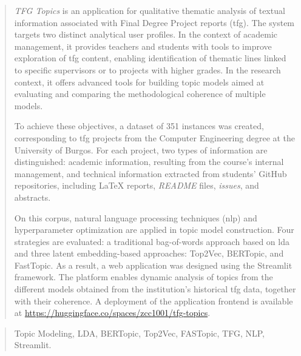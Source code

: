 \documentclass[a4paper,12pt,twoside]{memoir}
\newcommand{\nombreProyecto}{\textit{TFG Topics}\xspace}
\begin{document}
\clearpage

\renewcommand*\abstractname{Abstract}
\begin{abstract}
  \nombreProyecto{} is an application for qualitative thematic analysis of textual information associated with Final Degree Project reports (\Acrshort{tfg}). The system targets two distinct analytical user profiles. In the context of academic management, it provides teachers and students with tools to improve exploration of \Acrshort{tfg} content, enabling identification of thematic lines linked to specific supervisors or to projects with higher grades. In the research context, it offers advanced tools for building topic models aimed at evaluating and comparing the methodological coherence of multiple models.

  To achieve these objectives, a dataset of 351 instances was created,
  corresponding to \Acrshort{tfg} projects from the Computer Engineering degree
  at the University of Burgos. For each project, two types of information are
  distinguished: academic information, resulting from the course’s internal
  management, and technical information extracted from students’ GitHub
  repositories, including LaTeX reports, \textit{README} files, \textit{issues},
  and abstracts.

  On this corpus, natural language processing techniques (\Acrshort{nlp}) and
  hyperparameter optimization are applied in topic model construction. Four
  strategies are evaluated: a traditional bag-of-words approach based on
  \acrfull{lda} and three latent embedding-based approaches: Top2Vec, BERTopic,
  and FastTopic. As a result, a web application was designed using the Streamlit
  framework. The platform enables dynamic analysis of topics from the different
  models obtained from the institution’s historical \Acrshort{tfg} data, together
  with their coherence. A deployment of the application frontend is available at
  \url{https://huggingface.co/spaces/zcc1001/tfg-topics}.
\end{abstract}

\renewcommand*\abstractname{Keywords}
\begin{abstract}
  Topic Modeling, LDA, BERTopic, Top2Vec, FASTopic, TFG, NLP, Streamlit.
\end{abstract}

\clearpage

\tableofcontents

\clearpage

\listoffigures

\clearpage

\listoftables
\clearpage

\mainmatter








\printnoidxglossary[type=\acronymtype,toctitle= Acrónimos,title=Acrónimos]
\printnoidxglossary[title=Glosario,toctitle=Glosario]



\end{document}
